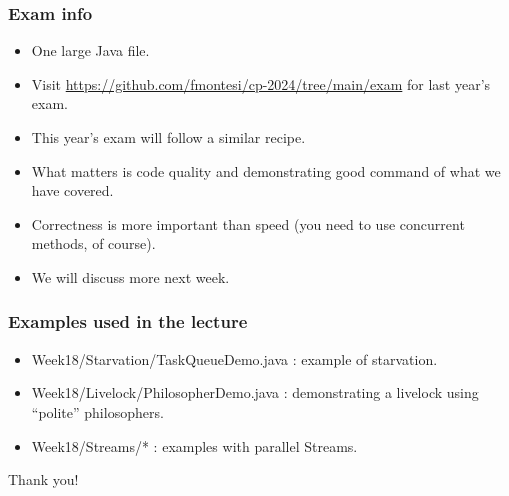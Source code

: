 \documentclass[xcolor={dvipsnames,svgnames},aspectratio=169]{beamer}
\begin{document}
\begin{frame}[fragile]
  \frametitle{Exam info}

  \begin{itemize}
  \item[\faBook]<1-> One large Java file.
  \item[\faBook]<1-> Visit
    \href{https://github.com/fmontesi/cp-2024/tree/main/exam}{https://github.com/fmontesi/cp-2024/tree/main/exam}
    for last year's exam.
  \item[\faBook]<1-> This year's exam will follow a similar recipe.
  \item[\faBook]<1-> What matters is code quality and demonstrating good
    command of what we have covered.
  \item[\faBook]<1-> Correctness is more important than speed (you need to use
    concurrent methods, of course).
  \item[\faBook]<1-> We will discuss more next week.
  \end{itemize}

\end{frame}

\begin{frame}[fragile]
  \frametitle{Examples  used in the lecture}

  \begin{itemize}
  \item[\faCode]<1-> Week18/Starvation/TaskQueueDemo.java : example of
    starvation.
  \item[\faCode]<1-> Week18/Livelock/PhilosopherDemo.java : demonstrating a
    livelock using ``polite'' philosophers.
  \item[\faCode]<1-> Week18/Streams/* : examples with parallel Streams.
  \end{itemize}

\end{frame}

\begin{frame}{}
  \centering \huge
  Thank you!
\end{frame}
\end{document}
